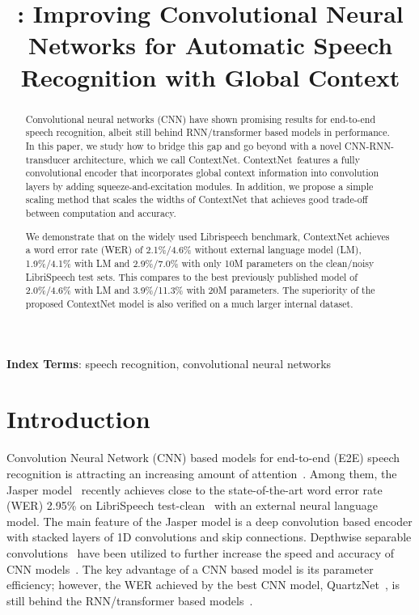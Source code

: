 \documentclass[a4paper]{article}
\title{\netname: Improving Convolutional Neural Networks for Automatic Speech Recognition with Global Context}
\newcommand{\netname}{ContextNet}
\begin{document}
\maketitle
\begin{abstract}
Convolutional neural networks (CNN) have shown promising results for end-to-end speech recognition, albeit still behind RNN/transformer based models in performance. In this paper, we study how to bridge this gap and go beyond with a novel CNN-RNN-transducer architecture, which we call \netname. \netname~features a fully convolutional encoder that incorporates global context information into convolution layers by adding squeeze-and-excitation modules. In addition, we propose a simple scaling method that scales the widths of \netname{} that achieves good trade-off between computation and accuracy. 

We demonstrate that on the widely used Librispeech benchmark, \netname{} achieves a word error rate (WER) of 2.1\%/4.6\% without external language model (LM), 1.9\%/4.1\% with LM and 2.9\%/7.0\% with only 10M parameters on the clean/noisy LibriSpeech test sets. This compares to the best previously published model of 2.0\%/4.6\% with LM and 3.9\%/11.3\% with 20M parameters. The superiority of the proposed \netname{} model is
 also verified on a much larger internal dataset. 

\end{abstract}
\noindent\textbf{Index Terms}: speech recognition, convolutional neural networks

\vspace{-0.1in}
\section{Introduction}

Convolution Neural Network (CNN) based models for end-to-end (E2E) speech recognition is attracting an increasing amount of attention~\cite{zhang2017very,zeghidour2018fully,li2019jasper,kriman2019quartznet}. Among them, the Jasper model~\cite{li2019jasper} recently achieves close to the state-of-the-art word error rate (WER) 2.95\%  on LibriSpeech test-clean~\cite{panayotov2015librispeech} with an external neural language model. The main feature of the Jasper model is a deep convolution based encoder with stacked layers of 1D convolutions and skip connections. Depthwise separable convolutions~\cite{chollet2017xception}  have been utilized to further increase the speed and accuracy of CNN models~\cite{hannun2019sequence,kriman2019quartznet}. The key advantage of a CNN based model is its parameter efficiency; however, the WER achieved by the best CNN model, QuartzNet~\cite{kriman2019quartznet}, is still behind the RNN/transformer based models~\cite{largespecaugment,karita2019comparative,wang2019transformer,zhang2020transformer}. 
\end{document}
